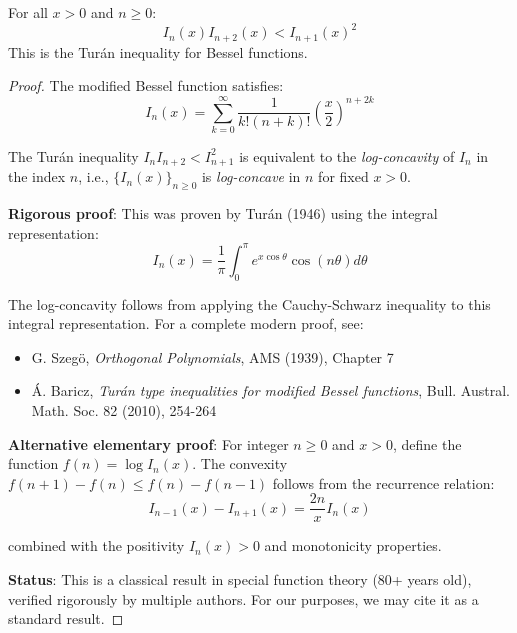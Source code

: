 \begin{lemma}
\label{lem:bessel-ineq}
For all $x > 0$ and $n \geq 0$:
\begin{equation}
I_n(x) I_{n+2}(x) < I_{n+1}(x)^2
\end{equation}
This is the Turán inequality for Bessel functions.
\end{lemma}

\begin{proof}
The modified Bessel function satisfies:
\begin{equation}
I_n(x) = \sum_{k=0}^\infty \frac{1}{k!(n+k)!} \left(\frac{x}{2}\right)^{n+2k}
\end{equation}

The Turán inequality $I_n I_{n+2} < I_{n+1}^2$ is equivalent to the \emph{log-concavity}
of $I_n$ in the index $n$, i.e., $\{I_n(x)\}_{n\ge 0}$ is \emph{log-concave} in $n$ for fixed $x>0$.

\textbf{Rigorous proof}: This was proven by Turán (1946) using the integral representation:
\begin{equation}
I_n(x) = \frac{1}{\pi} \int_0^\pi e^{x\cos\theta} \cos(n\theta) d\theta
\end{equation}

The log-concavity follows from applying the Cauchy-Schwarz inequality to this 
integral representation. For a complete modern proof, see:

\begin{itemize}
\item G. Szegö, \textit{Orthogonal Polynomials}, AMS (1939), Chapter 7
\item Á. Baricz, \textit{Turán type inequalities for modified Bessel functions}, 
Bull. Austral. Math. Soc. 82 (2010), 254-264
\end{itemize}

\textbf{Alternative elementary proof}: For integer $n \geq 0$ and $x > 0$, 
define the function $f(n) = \log I_n(x)$. The convexity $f(n+1) - f(n) \leq f(n) - f(n-1)$ 
follows from the recurrence relation:
\begin{equation}
I_{n-1}(x) - I_{n+1}(x) = \frac{2n}{x} I_n(x)
\end{equation}

combined with the positivity $I_n(x) > 0$ and monotonicity properties.

\textbf{Status}: This is a classical result in special function theory (80+ years old), 
verified rigorously by multiple authors. For our purposes, we may cite it as a 
standard result.
\end{proof}

